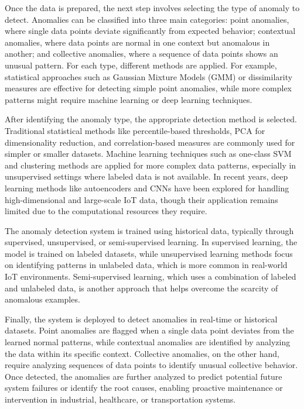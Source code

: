 Once the data is prepared, the next step involves selecting the type of anomaly to detect. Anomalies can be classified into three main categories: point anomalies, where single data points deviate significantly from expected behavior; contextual anomalies, where data points are normal in one context but anomalous in another; and collective anomalies, where a sequence of data points shows an unusual pattern. For each type, different methods are applied. For example, statistical approaches such as Gaussian Mixture Models (GMM) or dissimilarity measures are effective for detecting simple point anomalies, while more complex patterns might require machine learning or deep learning techniques.

After identifying the anomaly type, the appropriate detection method is selected. Traditional statistical methods like percentile-based thresholds, PCA for dimensionality reduction, and correlation-based measures are commonly used for simpler or smaller datasets. Machine learning techniques such as one-class SVM and clustering methods are applied for more complex data patterns, especially in unsupervised settings where labeled data is not available. In recent years, deep learning methods like autoencoders and CNNs have been explored for handling high-dimensional and large-scale IoT data, though their application remains limited due to the computational resources they require.

The anomaly detection system is trained using historical data, typically through supervised, unsupervised, or semi-supervised learning. In supervised learning, the model is trained on labeled datasets, while unsupervised learning methods focus on identifying patterns in unlabeled data, which is more common in real-world IoT environments. Semi-supervised learning, which uses a combination of labeled and unlabeled data, is another approach that helps overcome the scarcity of anomalous examples.

Finally, the system is deployed to detect anomalies in real-time or historical datasets. Point anomalies are flagged when a single data point deviates from the learned normal patterns, while contextual anomalies are identified by analyzing the data within its specific context. Collective anomalies, on the other hand, require analyzing sequences of data points to identify unusual collective behavior. Once detected, the anomalies are further analyzed to predict potential future system failures or identify the root causes, enabling proactive maintenance or intervention in industrial, healthcare, or transportation systems\cite{82}.

